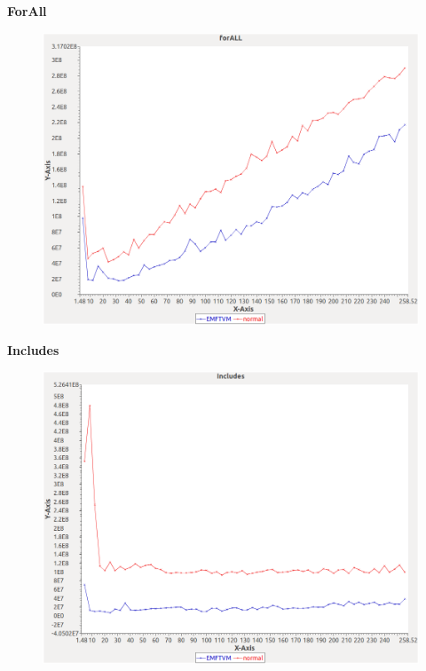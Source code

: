 \noindent\textbf{ForAll}

\begin{figure}[h]
\centering
\includegraphics[width=\textwidth]{graphs/orderedset/forALL}
\end{figure}
\pagebreak

\noindent\textbf{Includes}

\begin{figure}[h]
\centering
\includegraphics[width=\textwidth]{graphs/orderedset/Includes}
\end{figure}
\pagebreak

